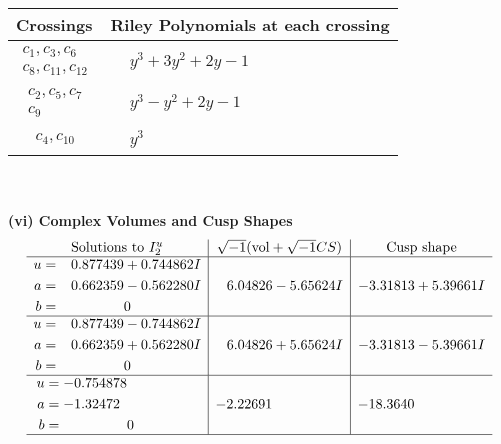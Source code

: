 \documentclass[1p]{elsarticle_modified}
\theoremstyle{definition}
\newcommand{\I}{\sqrt{-1}}
\begin{document}
\begin{tabular}{m{50pt}|m{274pt}}
Crossings & \hspace{64pt}Riley Polynomials at each crossing \\
\hline $$\begin{aligned}c_{1},c_{3},c_{6}\\c_{8},c_{11},c_{12}\end{aligned}$$&$\begin{aligned}
&y^3+3 y^2+2 y-1
\end{aligned}$\\
\hline $$\begin{aligned}c_{2},c_{5},c_{7}\\c_{9}\end{aligned}$$&$\begin{aligned}
&y^3- y^2+2 y-1
\end{aligned}$\\
\hline $$\begin{aligned}c_{4},c_{10}\end{aligned}$$&$\begin{aligned}
&y^3
\end{aligned}$\\
\hline
\end{tabular}\\~\\
\newpage\flushleft \textbf{(vi) Complex Volumes and Cusp Shapes}
$$\begin{array}{c|c|c}  
\text{Solutions to }I^u_{2}& \I (\text{vol} + \sqrt{-1}CS) & \text{Cusp shape}\\
 \hline 
\begin{aligned}
u &= \phantom{-}0.877439 + 0.744862 I \\
a &= \phantom{-}0.662359 - 0.562280 I \\
b &= \phantom{-0.000000 } 0\end{aligned}
 & \phantom{-}6.04826 - 5.65624 I & -3.31813 + 5.39661 I \\ \hline\begin{aligned}
u &= \phantom{-}0.877439 - 0.744862 I \\
a &= \phantom{-}0.662359 + 0.562280 I \\
b &= \phantom{-0.000000 } 0\end{aligned}
 & \phantom{-}6.04826 + 5.65624 I & -3.31813 - 5.39661 I \\ \hline\begin{aligned}
u &= -0.754878\phantom{ +0.000000I} \\
a &= -1.32472\phantom{ +0.000000I} \\
b &= \phantom{-0.000000 } 0\end{aligned}
 & -2.22691\phantom{ +0.000000I} & -18.3640\phantom{ +0.000000I}\\
 \hline 
 \end{array}$$\newpage\newpage\renewcommand{\arraystretch}{1}
\end{document}
